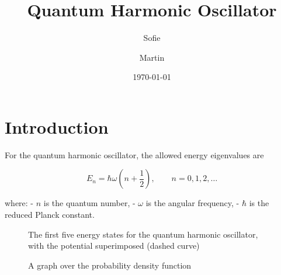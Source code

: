 \documentclass{article}
\title{Quantum Harmonic Oscillator}
\author{Sofie \and Martin}
\date{\today}
\begin{document}
\maketitle

\section{Introduction}

For the quantum harmonic oscillator, the allowed energy eigenvalues are

\[
E_n = \hbar \omega \left(n + \frac{1}{2}\right),
\qquad n = 0, 1, 2, \dots
\]

where:
- \(n\) is the quantum number,
- \(\omega\) is the angular frequency,
- \(\hbar\) is the reduced Planck constant.

\begin{figure}[H]
    \centering
    \caption{The first five energy states for the quantum harmonic oscillator, with the potential superimposed (dashed curve)}
    \label{fig.5_energy_states}
\end{figure}

\begin{figure}[H]
    \centering
    \caption{A graph over the probability density function}
    \label{fig.probability_density_60}
\end{figure}
\end{document}
